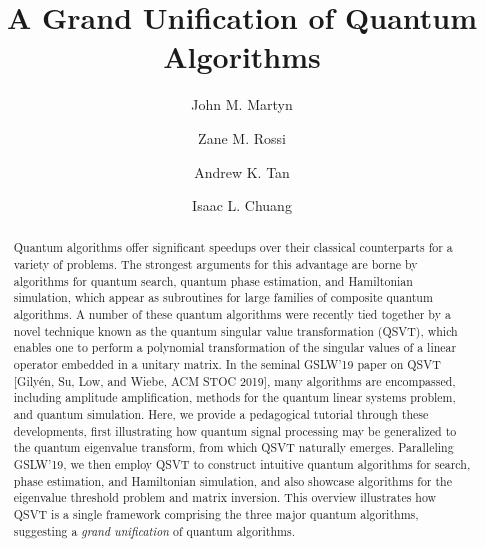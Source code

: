 \documentclass[aps,pra,showpacs,notitlepage,twocolumn,superscriptaddress,nofootinbib]{revtex4-1}
\begin{document}
    \title{A Grand Unification of Quantum Algorithms}
    \author{John M. Martyn}
    \author{Zane M. Rossi}
    \author{Andrew K. Tan}
    \author{Isaac L. Chuang} 

\begin{abstract}
    Quantum algorithms offer significant speedups over their classical counterparts for a variety of problems. The strongest arguments for this advantage are borne by algorithms for quantum search, quantum phase estimation, and Hamiltonian simulation, which appear as subroutines for large families of composite quantum algorithms. A number of these quantum algorithms were recently tied together by a novel technique known as the quantum singular value transformation (QSVT), which enables one to perform a polynomial transformation of the singular values of a linear operator embedded in a unitary matrix. In the seminal GSLW'19 paper on QSVT [Gily\'en, Su, Low, and Wiebe, ACM STOC 2019], many algorithms are encompassed, including amplitude amplification, methods for the quantum linear systems problem, and quantum simulation. Here, we provide a pedagogical tutorial through these developments, first illustrating how quantum signal processing may be generalized to the quantum eigenvalue transform, from which QSVT naturally emerges. Paralleling GSLW'19, we then employ QSVT to construct intuitive quantum algorithms for search, phase estimation, and Hamiltonian simulation, and also showcase algorithms for the eigenvalue threshold problem and matrix inversion. This overview illustrates how QSVT is a single framework comprising the three major quantum algorithms, suggesting a \emph{grand unification} of quantum algorithms.
\end{abstract}
\end{document}
